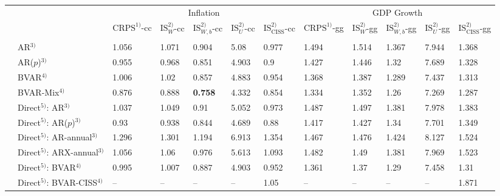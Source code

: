 \begin{table}[!h]
\centering
\begin{tabular}{llllllllllll}
\toprule
\multicolumn{2}{c}{ } & \multicolumn{5}{c}{{Inflation\hspace*{15mm}}} & \multicolumn{5}{c}{{GDP Growth}} \\
\cmidrule(l{3pt}r{3pt}){3-7} \cmidrule(l{3pt}r{3pt}){8-12}
 &  & $\text{CRPS}^{1)}$-cc & $\text{IS}_{W}^{2)}$-cc & $\text{IS}_{W,b}^{2)}$-cc & $\text{IS}_{U}^{2)}$-cc & $\text{IS}_{\text{CISS}}^{2)}$-cc & $\text{CRPS}^{1)}$-gg & $\text{IS}_{W}^{2)}$-gg & $\text{IS}_{W,b}^{2)}$-gg & $\text{IS}_{U}^{2)}$-gg & $\text{IS}_{\text{CISS}}^{2)}$-gg\\
\midrule
\cellcolor{gray!35}{} & \cellcolor{gray!35}{IMF} & \cellcolor{gray!35}{0.914} & \cellcolor{gray!35}{0.925} & \cellcolor{gray!35}{0.825} & \cellcolor{gray!35}{4.863} & \cellcolor{gray!35}{0.899} & \cellcolor{gray!35}{\textbf{1.173}} & \cellcolor{gray!35}{\textbf{1.189}} & \cellcolor{gray!35}{\textbf{1.128}} & \cellcolor{gray!35}{\textbf{6.475}} & \cellcolor{gray!35}{\textbf{1.188}}\\
\parbox[t]{2mm}{}
 & AR$^{3)}$ & 1.056 & 1.071 & 0.904 & 5.08 & 0.977 & 1.494 & 1.514 & 1.367 & 7.944 & 1.368\\
 & AR($p$)$^{3)}$ & 0.955 & 0.968 & 0.851 & 4.903 & 0.9 & 1.427 & 1.446 & 1.32 & 7.689 & 1.328\\
 & BVAR$^{4)}$ & 1.006 & 1.02 & 0.857 & 4.883 & 0.954 & 1.368 & 1.387 & 1.289 & 7.437 & 1.313\\
 & BVAR-Mix$^{4)}$ & 0.876 & 0.888 & \textbf{0.758} & 4.332 & 0.854 & 1.334 & 1.352 & 1.26 & 7.269 & 1.287\\
 & Direct$^{5)}$: AR$^{3)}$ & 1.037 & 1.049 & 0.91 & 5.052 & 0.973 & 1.487 & 1.497 & 1.381 & 7.978 & 1.383\\
 & Direct$^{5)}$: AR($p$)$^{3)}$ & 0.93 & 0.938 & 0.844 & 4.689 & 0.88 & 1.417 & 1.427 & 1.34 & 7.701 & 1.349\\
 & Direct$^{5)}$: AR-annual$^{3)}$ & 1.296 & 1.301 & 1.194 & 6.913 & 1.354 & 1.467 & 1.476 & 1.424 & 8.127 & 1.524\\
 & Direct$^{5)}$: ARX-annual$^{3)}$ & 1.056 & 1.06 & 0.976 & 5.613 & 1.093 & 1.482 & 1.49 & 1.381 & 7.969 & 1.523\\
 & Direct$^{5)}$: BVAR$^{4)}$ & 0.995 & 1.007 & 0.887 & 4.903 & 0.952 & 1.361 & 1.37 & 1.29 & 7.458 & 1.31\\
 & Direct$^{5)}$: BVAR-CISS$^{4)}$ & -- & -- & -- & -- & 1.05 & -- & -- & -- & -- & 1.871\\

\end{tabular}
\end{table}
